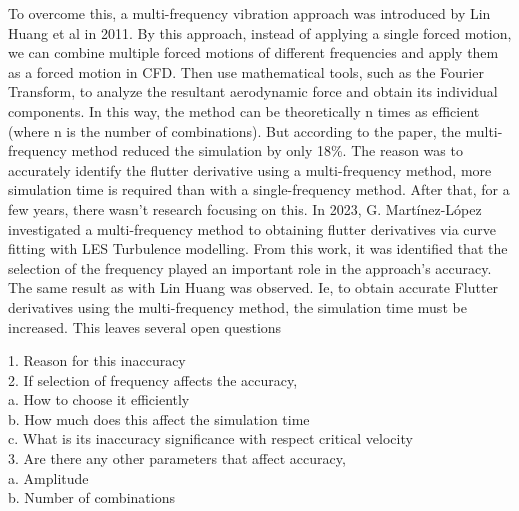 \documentclass[a4paper, 12pt]{report}
\begin{document}
\vspace{0.5 cm}

To overcome this, a multi-frequency vibration approach was introduced by Lin Huang et al in 2011. 
By this approach, instead of applying a single forced motion, we can combine multiple forced 
motions of different frequencies and apply them as a forced motion in CFD. Then use mathematical 
tools, such as the Fourier Transform, to analyze the resultant aerodynamic force and obtain its 
individual components. In this way, the method can be theoretically n times as efficient (where n 
is the number of combinations). But according to the paper, the multi-frequency method reduced 
the simulation by only 18\%. The reason was to accurately identify the flutter derivative using a 
multi-frequency method, more simulation time is required than with a single-frequency method. 
After that, for a few years, there wasn’t research focusing on this. In 2023, G. Martínez-López 
investigated a multi-frequency method to obtaining flutter derivatives via curve fitting with LES 
Turbulence modelling. From this work, it was identified that the selection of the frequency played 
an important role in the approach's accuracy. The same result as with Lin Huang was observed. Ie, 
to obtain accurate Flutter derivatives using the multi-frequency method, the simulation time must 
be increased. This leaves several open questions  


\begin{flushleft}
\hspace{2cm}1. Reason for this inaccuracy \\
\hspace{2cm}2. If selection of frequency affects the accuracy, \\
\hspace{3cm}a. How to choose it efficiently \\
\hspace{3cm}b. How much does this affect the simulation time \\
\hspace{3cm}c. What is its inaccuracy significance with respect critical velocity \\
\hspace{2cm}3. Are there any other parameters that affect accuracy, \\
\hspace{3cm}a. Amplitude \\
\hspace{3cm}b. Number of combinations
\end{flushleft}
\end{document}
